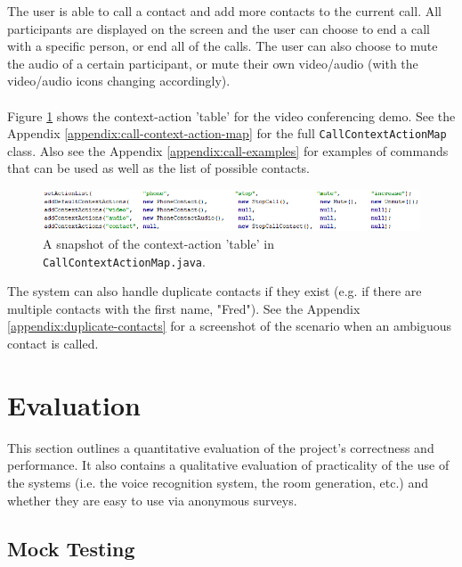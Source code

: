 \documentclass[11pt]{article}
\begin{document}
The user is able to call a contact and add more contacts to the current call. All participants are displayed on the screen and the user can choose to end a call with a specific person, or end all of the calls. The user can also choose to mute the audio of a certain participant, or mute their own video/audio (with the video/audio icons changing accordingly).
\\
\\
Figure \ref{fig:call-context-action-map} shows the context-action 'table' for the video conferencing demo. See the Appendix \ref{appendix:call-context-action-map} for the full \texttt{CallContextActionMap} class. Also see the Appendix \ref{appendix:call-examples} for examples of commands that can be used as well as the list of possible contacts.

\begin{center}
\begin{figure}[H]
\begin{center}
  \includegraphics[width=\linewidth]{call-context-action-map.png}
  \caption{A snapshot of the context-action 'table' in \texttt{CallContextActionMap.java}.}
  \label{fig:call-context-action-map}
  \end{center}
\end{figure}
\end{center}

The system can also handle duplicate contacts if they exist (e.g. if there are multiple contacts with the first name, "Fred"). See the Appendix \ref{appendix:duplicate-contacts} for a screenshot of the scenario when an ambiguous contact is called.

\newpage
\section{Evaluation}
\label{evaluation}

This section outlines a quantitative evaluation of the project's correctness and performance. It also contains a qualitative evaluation of practicality of the use of the systems (i.e. the voice recognition system, the room generation, etc.) and whether they are easy to use via anonymous surveys.

\subsection{Mock Testing}
\end{document}
